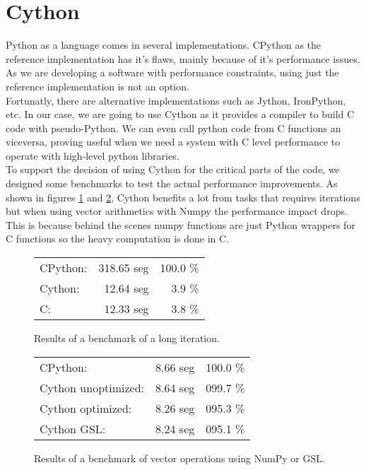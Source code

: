 \section{Cython}

Python as a language comes in several implementations. CPython as the reference
implementation has it's flaws, mainly because of it's performance issues. As we
are developing a software with performance constraints, using just the reference
implementation is not an option.\\

Fortunatly, there are alternative implementations such as Jython, IronPython,
etc. In our case, we are going to use Cython\cite{Cython} as it provides a
compiler to build C code with pseudo-Python. We can even call python code from
C functions an viceversa, proving useful when we need a system with C level
performance to operate with high-level python libraries.\\

To support the decision of using Cython for the critical parts of the code,
we designed some benchmarks to test the actual performance improvements. As
shown in figures \ref{Cython:fig:1} and \ref{Cython:fig:2}, Cython benefits
a lot from tasks that requires iterations but when using vector arithmetics
with Numpy the performance impact drops. This is because behind the scenes
numpy functions are just Python wrappers for C functions so the heavy
computation is done in C.\\

\begin{figure}[ht!]
  \begin{center}
    \begin{tabular}{l r r}
      CPython:  & 318.65 seg & 100.0 \% \\
      Cython:   & 12.64 seg  & 3.9 \%   \\
      C:        & 12.33 seg  & 3.8 \%   \\
    \end{tabular}
  \end{center}
  \caption{Results of a benchmark of a long iteration.}
  \label{Cython:fig:1}
\end{figure}

\begin{figure}[ht!]
  \begin{center}
    \begin{tabular}{l r r}
      CPython:            & 8.66 seg & 100.0 \% \\
      Cython unoptimized: & 8.64 seg & 099.7 \% \\
      Cython optimized:   & 8.26 seg & 095.3 \% \\
      Cython GSL:         & 8.24 seg & 095.1 \%
    \end{tabular}
  \end{center}
  \caption{Results of a benchmark of vector operations using NumPy or GSL.}
  \label{Cython:fig:2}
\end{figure}

